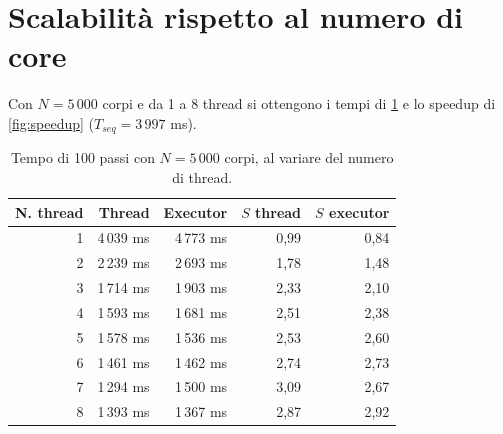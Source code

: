 %
%
\clearpage
\section{Scalabilità rispetto al numero di core}
Con $N = 5\,000$ corpi e da 1 a 8 thread si ottengono i tempi di \cref{tab:scalabilita} e lo speedup di \cref{fig:speedup} ($T_{seq} = 3\,997$ ms).

\begin{table}[H]
  \centering
  \begin{tabular}{rrrrr}
    \toprule
    N. thread & Thread & Executor & $S$ thread & $S$ executor \\
    \midrule
    1 & 4\,039 ms & 4\,773 ms & 0,99 & 0,84 \\
    2 & 2\,239 ms & 2\,693 ms & 1,78 & 1,48 \\
    3 & 1\,714 ms & 1\,903 ms & 2,33 & 2,10 \\
    4 & 1\,593 ms & 1\,681 ms & 2,51 & 2,38 \\
    5 & 1\,578 ms & 1\,536 ms & 2,53 & 2,60 \\
    6 & 1\,461 ms & 1\,462 ms & 2,74 & 2,73 \\
    7 & 1\,294 ms & 1\,500 ms & 3,09 & 2,67 \\
    8 & 1\,393 ms & 1\,367 ms & 2,87 & 2,92 \\
    \bottomrule
  \end{tabular}
  \caption{Tempo di 100 passi con $N = 5\,000$ corpi, al variare del numero di thread.}
  \label{tab:scalabilita}
\end{table}

